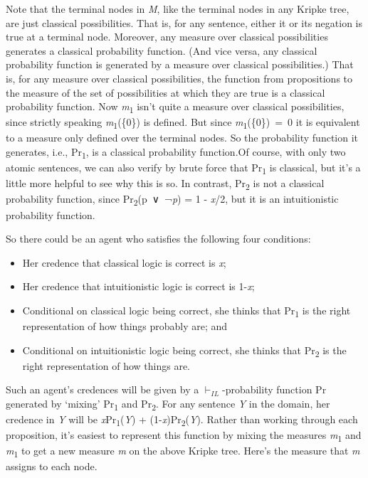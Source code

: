 \documentclass[
  11pt,
  letterpaper,
  DIV=11,
  numbers=noendperiod,
  twoside]{scrartcl}
\providecommand{\tightlist}{%
  \setlength{\itemsep}{0pt}\setlength{\parskip}{0pt}}
\begin{document}
Note that the terminal nodes in \emph{M}, like the terminal nodes in any
Kripke tree, are just classical possibilities. That is, for any
sentence, either it or its negation is true at a terminal node.
Moreover, any measure over classical possibilities generates a classical
probability function. (And vice versa, any classical probability
function is generated by a measure over classical possibilities.) That
is, for any measure over classical possibilities, the function from
propositions to the measure of the set of possibilities at which they
are true is a classical probability function. Now
\emph{m}\textsubscript{1} isn't quite a measure over classical
possibilities, since strictly speaking \emph{m}\textsubscript{1}(\{0\})
is defined. But since \emph{m}\textsubscript{1}(\{0\})~=~0 it is
equivalent to a measure only defined over the terminal nodes. So the
probability function it generates, i.e., Pr\textsubscript{1}, is a
classical probability function.Of course, with only two atomic
sentences, we can also verify by brute force that Pr\textsubscript{1} is
classical, but it's a little more helpful to see why this is so. In
contrast, Pr\textsubscript{2} is not a classical probability function,
since Pr\textsubscript{2}(p~∨~¬\emph{p}) = 1 - \emph{x}/2, but it is an
intuitionistic probability function.

So there could be an agent who satisfies the following four conditions:

\begin{itemize}
\tightlist
\item
  Her credence that classical logic is correct is \emph{x};
\item
  Her credence that intuitionistic logic is correct is 1-\emph{x};
\item
  Conditional on classical logic being correct, she thinks that
  Pr\textsubscript{1} is the right representation of how things probably
  are; and
\item
  Conditional on intuitionistic logic being correct, she thinks that
  Pr\textsubscript{2} is the right representation of how things are.
\end{itemize}

Such an agent's credences will be given by a \(\vdash_{IL}\)-probability
function Pr generated by `mixing' Pr\textsubscript{1} and
Pr\textsubscript{2}. For any sentence \emph{Y} in the domain, her
credence in \emph{Y} will be \emph{x}Pr\textsubscript{1}(\emph{Y}) +
(1-\emph{x})Pr\textsubscript{2}(\emph{Y}). Rather than working through
each proposition, it's easiest to represent this function by mixing the
measures \emph{m}\textsubscript{1} and \emph{m}\textsubscript{1} to get
a new measure \emph{m} on the above Kripke tree. Here's the measure that
\emph{m} assigns to each node.
\end{document}
